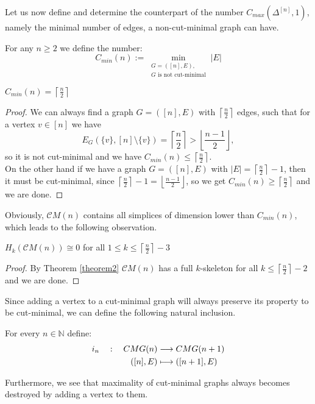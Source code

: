 Let us now define and determine the counterpart of the number \(C_{max}(\Delta^{[n]},1)\), namely the minimal number of  edges, a non-cut-minimal graph can have.
\begin{defi}
For any \(n\geq 2\) we define the number:
\[
C_{min}(n):=\min\limits_{\substack{G=([n],E),\\G\text{ is not cut-minimal}}}|E|
\]
\end{defi}
\begin{thm}\label{theorem2}
\(C_{min}(n)=\left\lceil\frac{n}{2}\right\rceil\)
\begin{proof}
We can always find a graph \(G=([n],E)\) with \(\left\lceil\frac{n}{2}\right\rceil\) edges, such that for a vertex \(v\in [n]\) we have
\[
E_G(\{v\},[n]\setminus\{v\})=\left\lceil\frac{n}{2}\right\rceil>\left\lfloor\frac{n-1}{2}\right\rfloor,
\]
so it is not cut-minimal and we have \(C_{min}(n)\leq\left\lceil\frac{n}{2}\right\rceil\).\\
On the other hand if we have a graph \(G=([n],E)\) with \(|E|=\left\lceil\frac{n}{2}\right\rceil-1\), then it must be cut-minimal, since \(\left\lceil\frac{n}{2}\right\rceil-1=\left\lfloor\frac{n-1}{2}\right\rfloor\), so we get \(C_{min}(n)\geq\left\lceil\frac{n}{2}\right\rceil\) and we are done.
\end{proof}
\end{thm}
Obviously, \(\mathcal{C}M(n)\) contains all simplices of dimension lower than \(C_{min}(n)\), which leads to the following observation.
\begin{cor}
\(H_k(\mathcal{C}M(n))\cong 0\) for all \(1\leq k\leq\left\lceil\frac{n}{2}\right\rceil-3\)
\begin{proof}
By Theorem \ref{theorem2} \(\mathcal{C}M(n)\) has a full \(k\)-skeleton for all \(k\leq\left\lceil\frac{n}{2}\right\rceil-2\) and we are done. 
\end{proof}
\end{cor}
Since adding a vertex to a cut-minimal graph will always preserve its property to be cut-minimal, we can define the following natural inclusion.
\begin{defi}
For every \(n\in\mathbb{N}\) define:
\begin{align}
i_n\quad :\quad CMG(n)&\longrightarrow CMG(n+1)\notag \\
([n],E)&\longmapsto ([n+1],E)\notag
\end{align}
\end{defi}
Furthermore, we see that maximality of cut-minimal graphs always becomes destroyed by adding a vertex to them.
